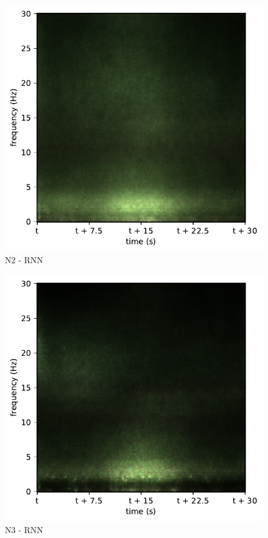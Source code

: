 \begin{subfigure}{.16\textwidth}
  \centering
  \includegraphics[width=1\linewidth]{./pics/class_rnn_2}
  \caption{N2 - RNN}
  \label{fig_1_33}
\end{subfigure}%
\begin{subfigure}{.16\textwidth}
  \centering
  \includegraphics[width=1\linewidth]{./pics/class_rnn_3}
  \caption{N3 - RNN}
  \label{fig_1_34}
\end{subfigure}%
